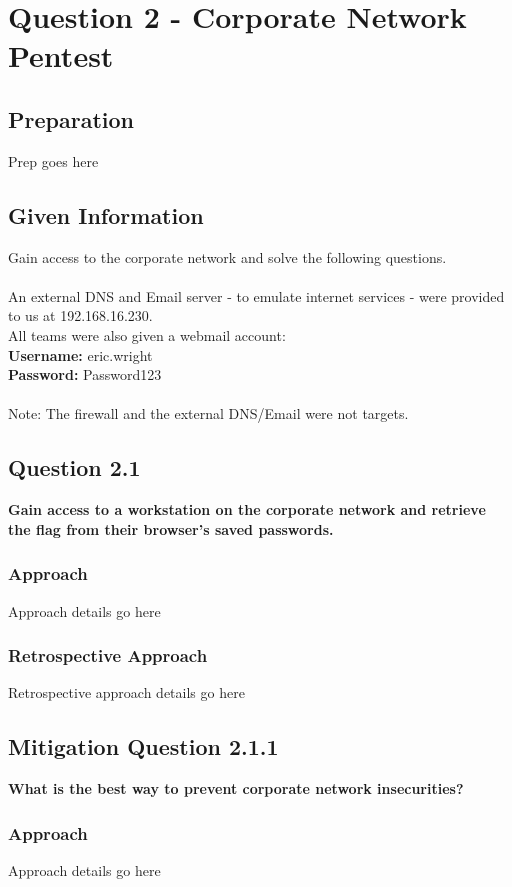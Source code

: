 \chapter{Question 2 - Corporate Network Pentest}

\section{Preparation}
Prep goes here

\section{Given Information}
Gain access to the corporate network and solve the following questions.
\\\\
An external DNS and Email server - to emulate internet services - were provided
to us at 192.168.16.230.\\
All teams were also given a webmail account:\\
\textbf{Username:} eric.wright
\\
\textbf{Password:} Password123
\\\\
Note: The firewall and the external DNS/Email were not targets.

\section{Question 2.1}
\textbf{Gain access to a workstation on the corporate network and retrieve the
flag from their browser's saved passwords.}
\subsection{Approach}
Approach details go here
\subsection{Retrospective Approach}
Retrospective approach details go here

\section{Mitigation Question 2.1.1}
\textbf{What is the best way to prevent corporate network insecurities?}
\subsection{Approach}
Approach details go here

